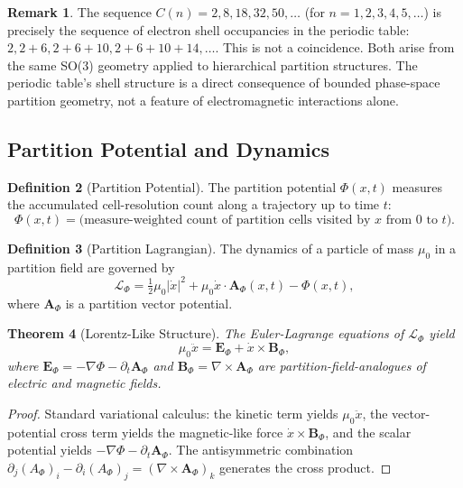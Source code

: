 \documentclass[11pt,twocolumn,a4paper]{article}
\newtheorem{theorem}{Theorem}[section]
\theoremstyle{definition}
\newtheorem{definition}[theorem]{Definition}
\newtheorem{remark}[theorem]{Remark}
\newcommand{\calL}{\mathcal{L}}
\begin{document}
\begin{remark}
The sequence $C(n) = 2, 8, 18, 32, 50, \ldots$ (for $n=1,2,3,4,5,\ldots$) is precisely the sequence of electron shell occupancies in the periodic table: $2, 2+6, 2+6+10, 2+6+10+14, \ldots$. This is not a coincidence. Both arise from the same SO(3) geometry applied to hierarchical partition structures. The periodic table's shell structure is a direct consequence of bounded phase-space partition geometry, not a feature of electromagnetic interactions alone.
\end{remark}

\subsection{Partition Potential and Dynamics}

\begin{definition}[Partition Potential]
The partition potential $\Phi(x, t)$ measures the accumulated cell-resolution count along a trajectory up to time $t$:
\[
\Phi(x,t) = \text{(measure-weighted count of partition cells visited by } x \text{ from } 0 \text{ to } t).
\]
\end{definition}

\begin{definition}[Partition Lagrangian]
The dynamics of a particle of mass $\mu_0$ in a partition field are governed by
\[
\calL_\Phi = \tfrac{1}{2}\mu_0|\dot{x}|^2 + \mu_0\dot{x} \cdot \bm{A}_\Phi(x,t) - \Phi(x,t),
\]
where $\bm{A}_\Phi$ is a partition vector potential.
\end{definition}

\begin{theorem}[Lorentz-Like Structure]
\label{thm:lorentz}
The Euler-Lagrange equations of $\calL_\Phi$ yield
\[
\mu_0 \ddot{x} = \bm{E}_\Phi + \dot{x} \times \bm{B}_\Phi,
\]
where $\bm{E}_\Phi = -\nabla\Phi - \partial_t\bm{A}_\Phi$ and $\bm{B}_\Phi = \nabla \times \bm{A}_\Phi$ are partition-field-analogues of electric and magnetic fields.
\end{theorem}

\begin{proof}
Standard variational calculus: the kinetic term yields $\mu_0\ddot{x}$, the vector-potential cross term yields the magnetic-like force $\dot{x} \times \bm{B}_\Phi$, and the scalar potential yields $-\nabla\Phi - \partial_t\bm{A}_\Phi$. The antisymmetric combination $\partial_j(A_\Phi)_i - \partial_i(A_\Phi)_j = (\nabla \times \bm{A}_\Phi)_k$ generates the cross product.
\end{proof}
\end{document}

